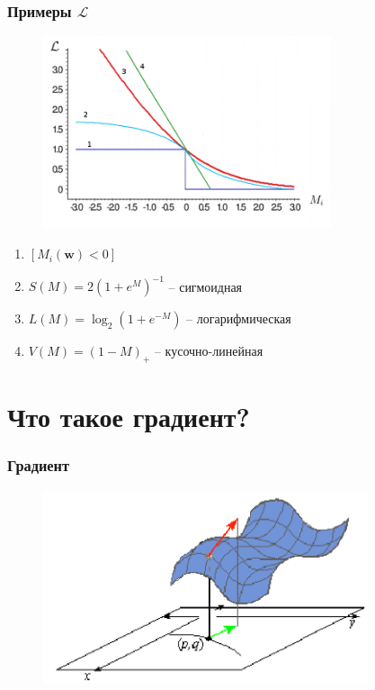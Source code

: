\documentclass[10pt]{beamer}
\begin{document}
\begin{frame}\frametitle{Примеры $\mathcal{L}$}
	\begin{figure}[htbp]
	  \includegraphics[height=160pt, keepaspectratio = true]{images/l}
	\end{figure}

	\begin{enumerate}
		\item $\left[M_i(\mathbf{w}) < 0 \right]$
		\item $S(M) = 2(1+e^M)^{-1}$ -- сигмоидная
		\item $L(M) = \log_2(1+e^{-M})$ -- логарифмическая
		\item $V(M) = (1-M)_+$ -- кусочно-линейная
	\end{enumerate}
\end{frame}

\section{Что такое градиент?}

\begin{frame}\frametitle{Градиент}
	\begin{figure}[htbp]
	  \includegraphics[height=160pt, keepaspectratio = true]{images/gradient}
	\end{figure}
\end{frame}
\end{document}
